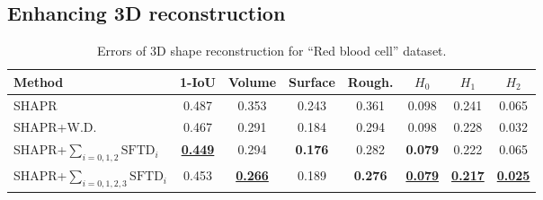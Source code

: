 \documentclass[runningheads]{llncs}
\begin{document}
\subsection{Enhancing 3D reconstruction}

\begin{table}[tbp]
\caption{Errors of 3D shape reconstruction for ``Red blood cell'' dataset.}
\label{tbl:SHAPR_red_blood_cell}
\vskip 0.15in
\begin{center}
\begin{small}
\begin{sc}
\begin{tabular}{lccccccc}
\toprule
Method & 1-IoU & Volume & Surface & Rough. & $H_0$ & $H_1$ & $H_2$\\
\midrule
SHAPR \cite{waibel2022shapr}  & 0.487 & 0.353 & 0.243 & 0.361 & 0.098 & 0.241 & 0.065 \\
SHAPR+W.D. \cite{waibel2022capturing} & 0.467 & 0.291 &  0.184 & 0.294 & 0.098 & 0.228 & 0.032\\
SHAPR+$\sum_{i=0, 1, 2} \text{SFTD}_i$  & \underline{\textbf{0.449}} & 0.294 & \textbf{0.176} & 0.282 & \textbf{0.079} & 0.222 & 0.065\\
SHAPR+$\sum_{i=0, 1, 2, 3} \text{SFTD}_i$  & 0.453 & \underline{\textbf{0.266}} & 0.189 & \textbf{0.276} & \underline{\textbf{0.079}} & \underline{\textbf{0.217}} & \underline{\textbf{0.025}}\\
\bottomrule
\end{tabular}
\end{sc}
\end{small}
\end{center}
\end{table}
\end{document}
